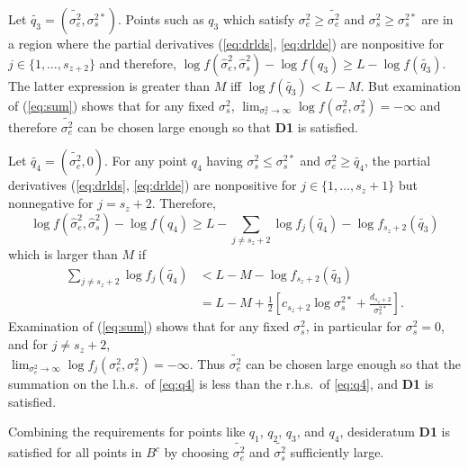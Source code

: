 \documentclass{report}
\newcommand{\RL}{f}
\newcommand{\logRL}{\log\RL}
\newcommand{\sigssq}{\sigma_s^2}
\newcommand{\sigesq}{\sigma_e^2}
\newcommand{\sshat}{\hat\sigma^2_e,\hat\sigma^2_s}
\newcommand{\logRLss}{\logRL(\sigesq,\sigssq)}
\begin{document}
Let $\widetilde{q_3} = (\widetilde{\sigma_e^2}, \sigma_s^{2*})$.  Points such as $q_3$ which satisfy $\sigesq \ge \widetilde{\sigma_e^2}$ and $\sigssq \ge \sigma_s^{2*}$ are in a region where the partial derivatives (\ref{eq:drlds}, \ref{eq:drlde}) are nonpositive for $j \in \{1, \dots, s_{z+2}\}$ and therefore, $\logRL(\sshat) - \logRL(q_3) \ge L - \logRL(\widetilde{q_3})$.  The latter expression is greater than $M$ iff $\logRL(\widetilde{q_3}) < L-M$.  But examination of (\ref{eq:sum}) shows that for any fixed $\sigssq$, $\lim_{\sigesq \rightarrow \infty} \logRLss = -\infty$ and therefore $\widetilde{\sigma_e^2}$ can be chosen large enough so that \textbf{D1} is satisfied.

Let $\widetilde{q_4} = (\widetilde{\sigma_e^2},0)$.  For any point $q_4$ having $\sigssq \le \sigma_s^{2*}$ and $\sigesq \ge \widetilde{q_4}$, the partial derivatives (\ref{eq:drlds}, \ref{eq:drlde}) are nonpositive for $j \in \{1, \dots, s_z+1\}$  but nonnegative for $j=s_z+2$.  Therefore,
\begin{equation*}
	\logRL(\sshat) - \logRL(q_4) \ge L - \sum_{j \ne s_z+2} \logRL_j(\widetilde{q_4}) - \logRL_{s_z+2}(\widetilde{q_3})
\end{equation*}
which is larger than $M$ if
\begin{equation}
\label{eq:q4}
  \begin{split}
    \sum_{j \ne s_z+2} \logRL_j(\widetilde{q_4})
      &< L - M - \logRL_{s_z+2}(\widetilde{q_3})\\
      &= L - M + \frac{1}{2} \left[ c_{s_z+2}\log\sigma_s^{2*} + \frac{d_{s_z+2}}{\sigma_s^{2*}}\right].
  \end{split}
\end{equation}
Examination of (\ref{eq:sum}) shows that for any fixed $\sigssq$, in particular for $\sigssq=0$, and for $j \ne s_z+2$,\\ $\lim_{\sigesq \rightarrow \infty} \logRL_j(\sigesq,\sigssq) = -\infty$.  Thus $\widetilde{\sigma_e^2}$ can be chosen large enough so that the summation on the l.h.s.~of \eqref{eq:q4} is less than the r.h.s.~of \eqref{eq:q4}, and  \textbf{D1} is satisfied.

Combining the requirements for points like $q_1$, $q_2$, $q_3$, and $q_4$, desideratum \textbf{D1} is satisfied for all points in $B^c$ by choosing $\widetilde{\sigma_e^2}$ and $\widetilde{\sigma_s^2}$ sufficiently large. 
\end{document}
